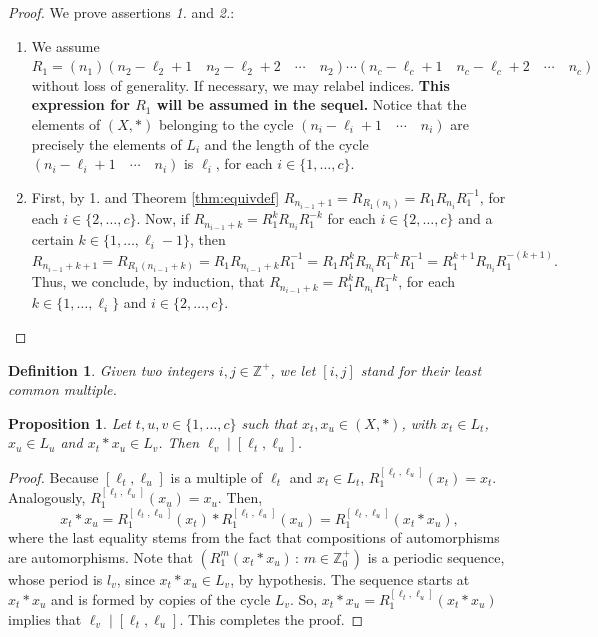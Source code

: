 \documentclass{article}
\newtheorem{proposition}[theorem]{Proposition}
\newtheorem{definition}[theorem]{Definition}
\begin{document}
\begin{proof}
We prove assertions \textit{1.} and \textit{2.}:
\begin{enumerate}
    \item We  assume $R_1=(n_1)(n_2-\ell_2+1\quad n_2-\ell_2+2\quad\cdots\quad n_2)\cdots(n_c-\ell_c+1\quad n_c-\ell_c+2\quad\cdots\quad n_c)$ without loss of generality. If necessary, we may relabel indices. \textbf{This expression for $R_1$ will be assumed in the sequel.} Notice that the elements of $(X,*)$ belonging to the cycle $(n_i-\ell_i+1\quad\cdots\quad n_i)$ are precisely the elements of $L_i$ and the length of the cycle $(n_i-\ell_i+1\quad\cdots\quad n_i)$ is $\ell_i$, for each $i\in\{1,\dots,c\}$.
    \item First, by 1. and Theorem \ref{thm:equivdef} $R_{n_{i-1}+1}=R_{R_1(n_i)}=R_1 R_{n_i}R_1^{-1}$, for each $i\in\{2,\dots,c\}$. Now, if $R_{n_{i-1}+k}=R_1^k R_{n_i}R_1^{-k}$ for each $i\in\{2,\dots,c\}$ and a certain $k\in\{1,\dots,\ell_i-1\}$, then \[R_{n_{i-1}+k+1}=R_{R_1(n_{i-1}+k)}=R_1 R_{n_{i-1}+k} R_1^{-1}=R_1 R_1^k R_{n_i}R_1^{-k}R_1^{-1}=R_1^{k+1}R_{n_i}R_1^{-(k+1)}.\] Thus, we conclude, by induction, that $R_{n_{i-1}+k}=R_1^{k}R_{n_i}R_1^{-k}$, for each $k\in\{1,\dots,\ell_i\}$ and $i\in\{2,\dots,c\}$.
    \end{enumerate}
\end{proof}



\begin{definition}
Given two integers $i,j\in\mathbb{Z}^+$, we let $[i,j]$ stand for their \emph{least common multiple}.
\end{definition}

\begin{proposition}\label{prop:main}
Let $t,u,v\in\{1,\dots,c\}$ such that $x_t,x_u\in (X, *)$, with $x_t\in L_t$, $x_u\in L_u$ and $x_t*x_u\in L_v$. Then $\ell_v\mid[\ell_t,\ell_u]$.
\end{proposition}

\begin{proof}
Because $[\ell_t,\ell_u]$ is a multiple of $\ell_t$ and $x_t\in L_t$, $R_1^{[\ell_t,\ell_u]}(x_t)=x_t$. Analogously, $R_1^{[\ell_t,\ell_u]}(x_u)=x_u$. Then, \[x_t*x_u=R_1^{[\ell_t,\ell_u]}(x_t)*R_1^{[\ell_t,\ell_u]}(x_u)=R_1^{[\ell_t,\ell_u]}(x_t*x_u),\] where the last equality stems from the fact that compositions of automorphisms are automorphisms. Note that $(R_1^m(x_t*x_u)\,:\,m\in \mathbb{Z}_0^+)$ is a periodic sequence, whose period is $l_v$, since $x_t\ast x_u\in L_v$, by hypothesis. The sequence starts at $x_t*x_u$ and is formed by copies of the cycle $L_v$. So, $x_t*x_u=R_1^{[\ell_t,\ell_u]}(x_t*x_u)$ implies that $\ell_v\mid[\ell_t,\ell_u]$. This completes the proof.
\end{proof}
\end{document}
